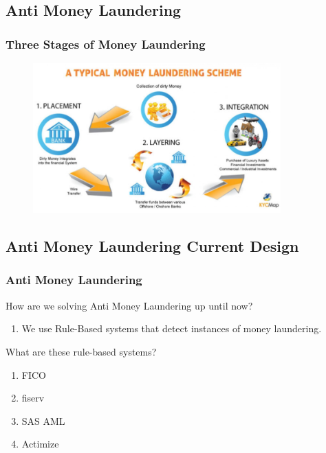 \documentclass[11pt,
               aspectratio=169,
               hyperref={colorlinks}
               ]{beamer}
\begin{document}
		\subsection{Anti Money Laundering}
	\begin{frame}
		\frametitle{Three Stages of Money Laundering}
		\begin{figure}[htb]
			\begin{center}
				\includegraphics[width=0.85\textwidth]{slide_resources/money_laundering_cycle.png}
				\label{fig:money_laundering_cycle}
			\end{center}
		\end{figure}
	\end{frame}

	\subsection{Anti Money Laundering Current Design}
	\begin{frame}
		\frametitle{Anti Money Laundering}
		How are we solving Anti Money Laundering up until now?\\
		\begin{enumerate}
			\item We use Rule-Based systems that detect instances of money laundering.
		\end{enumerate}
		
		What are these rule-based systems?
		\begin{enumerate}
			\item FICO
			\item fiserv
			\item SAS AML
			\item Actimize
		\end{enumerate}
	\end{frame}
\end{document}
